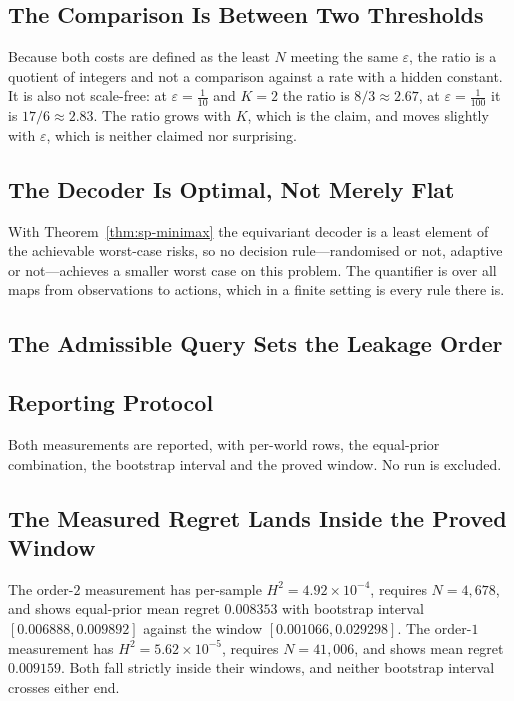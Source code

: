 \subsection{The Comparison Is Between Two Thresholds}

Because both costs are defined as the least $N$ meeting the same $\varepsilon$, the ratio is a
quotient of integers and not a comparison against a rate with a hidden constant. It is also
not scale-free: at $\varepsilon=\tfrac{1}{10}$ and $K=2$ the ratio is $8/3\approx2.67$, at
$\varepsilon=\tfrac{1}{100}$ it is $17/6\approx2.83$. The ratio grows with $K$, which is the
claim, and moves slightly with $\varepsilon$, which is neither claimed nor surprising.

\subsection{The Decoder Is Optimal, Not Merely Flat}

With Theorem~\ref{thm:sp-minimax} the equivariant decoder is a least element of the achievable
worst-case risks, so no decision rule---randomised or not, adaptive or not---achieves a
smaller worst case on this problem. The quantifier is over all maps from observations to
actions, which in a finite setting is every rule there is.


\subsection{The Admissible Query Sets the Leakage Order}
\label{sec:qy-results}

\subsection{Reporting Protocol}

Both measurements are reported, with per-world rows, the equal-prior combination, the
bootstrap interval and the proved window. No run is excluded.

\subsection{The Measured Regret Lands Inside the Proved Window}

The order-$2$ measurement has per-sample $H^{2}=4.92\times10^{-4}$, requires $N=4{,}678$,
and shows equal-prior mean regret $0.008353$ with bootstrap interval
$[0.006888,0.009892]$ against the window $[0.001066,0.029298]$. The order-$1$ measurement
has $H^{2}=5.62\times10^{-5}$, requires $N=41{,}006$, and shows mean regret $0.009159$. Both
fall strictly inside their windows, and neither bootstrap interval crosses either end.

